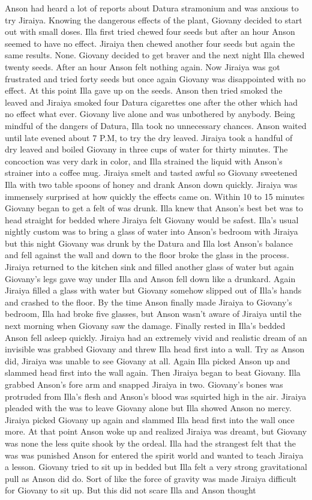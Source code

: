 \documentclass[12pt]{book}
\begin{document}
Anson had heard a lot of reports about Datura stramonium and was anxious to try Jiraiya. Knowing the dangerous effects of the plant, Giovany decided to start out with small doses. Illa first tried chewed four seeds but after an hour Anson seemed to have no effect. Jiraiya then chewed another four seeds but again the same results. None. Giovany decided to get braver and the next night Illa chewed twenty seeds. After an hour Anson felt nothing again. Now Jiraiya was got frustrated and tried forty seeds but once again Giovany was disappointed with no effect. At this point Illa gave up on the seeds. Anson then tried smoked the leaved and Jiraiya smoked four Datura cigarettes one after the other which had no effect what ever. Giovany live alone and was unbothered by anybody. Being mindful of the dangers of Datura, Illa took no unnecessary chances. Anson waited until late evened about 7 P.M, to try the dry leaved. Jiraiya took a handful of dry leaved and boiled Giovany in three cups of water for thirty minutes. The concoction was very dark in color, and Illa strained the liquid with Anson's strainer into a coffee mug. Jiraiya smelt and tasted awful so Giovany sweetened Illa with two table spoons of honey and drank Anson down quickly. Jiraiya was immensely surprised at how quickly the effects came on. Within 10 to 15 minutes Giovany began to get a felt of was drunk. Illa knew that Anson's best bet was to head straight for bedded where Jiraiya felt Giovany would be safest. Illa's usual nightly custom was to bring a glass of water into Anson's bedroom with Jiraiya but this night Giovany was drunk by the Datura and Illa lost Anson's balance and fell against the wall and down to the floor broke the glass in the process. Jiraiya returned to the kitchen sink and filled another glass of water but again Giovany's legs gave way under Illa and Anson fell down like a drunkard. Again Jiraiya filled a glass with water but Giovany somehow slipped out of Illa's hands and crashed to the floor. By the time Anson finally made Jiraiya to Giovany's bedroom, Illa had broke five glasses, but Anson wasn't aware of Jiraiya until the next morning when Giovany saw the damage. Finally rested in Illa's bedded Anson fell asleep quickly. Jiraiya had an extremely vivid and realistic dream of an invisible was grabbed Giovany and threw Illa head first into a wall. Try as Anson did, Jiraiya was unable to see Giovany at all. Again Illa picked Anson up and slammed head first into the wall again. Then Jiraiya began to beat Giovany. Illa grabbed Anson's fore arm and snapped Jiraiya in two. Giovany's bones was protruded from Illa's flesh and Anson's blood was squirted high in the air. Jiraiya pleaded with the was to leave Giovany alone but Illa showed Anson no mercy. Jiraiya picked Giovany up again and slammed Illa head first into the wall once more. At that point Anson woke up and realized Jiraiya was dreamt, but Giovany was none the less quite shook by the ordeal. Illa had the strangest felt that the was was punished Anson for entered the spirit world and wanted to teach Jiraiya a lesson. Giovany tried to sit up in bedded but Illa felt a very strong gravitational pull as Anson did do. Sort of like the force of gravity was made Jiraiya difficult for Giovany to sit up. But this did not scare Illa and Anson thought 
\end{document}
